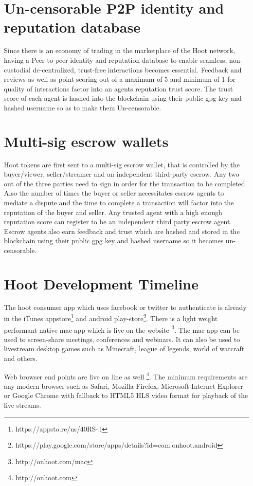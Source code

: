 \documentclass{article}
\begin{document}
\section{Un-censorable P2P identity and reputation database}
Since there is an economy of trading in the marketplace of the Hoot network, having a Peer to peer
identity and reputation database to enable seamless, non-custodial
de-centralized, trust-free interactions becomes essential. Feedback and
reviews as well as point scoring out of a maximum of 5 and minimum of
1 for quality of interactions factor into an agents reputation trust
score. The trust score of each agent is hashed into the blockchain
using their public gpg key and hashed username so as to make them Un-censorable.

\section{Multi-sig escrow wallets}
Hoot tokens are first sent to a multi-sig escrow wallet, that is controlled by the buyer/viewer, seller/streamer and an
independent third-party escrow. Any
two out of the three parties need to sign in order for the transaction to be
completed. Also the number of times the buyer or seller necessitates
escrow agents to mediate a dispute and the time to complete a
transaction will factor into the reputation of the buyer and
seller. Any trusted agent with a high enough reputation score can
register to be an independent third party escrow agent. Escrow agents
also earn feedback and trust which are hashed and stored in the
blockchain using their public gpg key and hashed username so it
becomes un-censorable.

\section{Hoot Development Timeline}
The hoot consumer app which uses facebook or twitter to authenticate
is already in the iTunes appstore\footnote{https://appsto.re/us/40RS-.i} and android play-store\footnote{https://play.google.com/store/apps/details?id=com.onhoot.android}.
There is a light weight performant native  mac app which is live on
the website \footnote{http://onhoot.com/mac}. The mac app can be used
to screen-share meetings, conferences and webinars. It can also be used
to livestream desktop games such as Minecraft, league of legends,
world of warcraft and others.

Web browser end points are live on line as well
\footnote{http://onhoot.com}. The minimum requirements are any modern
browser such as Safari, Mozilla Firefox, Microsoft Internet Explorer
or Google Chrome with fallback to HTML5 HLS video format for playback
of the live-streams.
\end{document}
